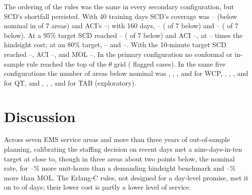 \documentclass[12pt]{article}
\begin{document}
The ordering of the rules was the same in every secondary configuration, but SCD's shortfall persisted. With 40 training days SCD's coverage was -- (below nominal in  of 7 areas) and ACI's --; with 160 days, -- ( of 7 below) and -- ( of 7 below). At a 95\% target SCD reached -- ( of 7 below) and ACI --, at -- times the hindsight cost; at an 80\% target, -- and --. With the 10-minute target SCD reached --, ACI --, and MOL --. In the primary configuration no conformal or in-sample rule reached the top of the $\theta$ grid ( flagged cases). In the same five configurations the number of areas below nominal was , , ,  and  for WCP, , , ,  and  for QT, and , , ,  and  for TAB (exploratory).

\section{Discussion}

Across seven EMS service areas and more than three years of out-of-sample planning, calibrating the staffing decision on recent days met a nine-days-in-ten target at close to, though in three areas about two points below, the nominal rate, for --\% more unit-hours than a demanding hindsight benchmark and --\% more than MOL. The Erlang-C rules, not designed for a day-level promise, met it on  to  of days; their lower cost is partly a lower level of service.
\end{document}
